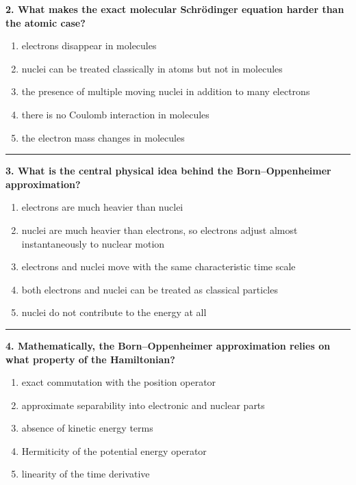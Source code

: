 \documentclass[
  english,
  9pt,
]{extbook}
\providecommand{\tightlist}{%
  \setlength{\itemsep}{0pt}\setlength{\parskip}{0pt}}
\theoremstyle{definition}
\theoremstyle{definition}
\theoremstyle{definition}
\theoremstyle{definition}
\theoremstyle{remark}
\begin{document}
\textbf{2. What makes the exact molecular Schrödinger equation harder than the atomic case?}

\begin{enumerate}
\def\labelenumi{\alph{enumi}.}
\tightlist
\item
  electrons disappear in molecules
\item
  nuclei can be treated classically in atoms but not in molecules
\item
  the presence of multiple moving nuclei in addition to many electrons
\item
  there is no Coulomb interaction in molecules
\item
  the electron mass changes in molecules
\end{enumerate}

\begin{center}\rule{0.5\linewidth}{0.5pt}\end{center}

\textbf{3. What is the central physical idea behind the Born--Oppenheimer approximation?}

\begin{enumerate}
\def\labelenumi{\alph{enumi}.}
\tightlist
\item
  electrons are much heavier than nuclei
\item
  nuclei are much heavier than electrons, so electrons adjust almost instantaneously to nuclear motion
\item
  electrons and nuclei move with the same characteristic time scale
\item
  both electrons and nuclei can be treated as classical particles
\item
  nuclei do not contribute to the energy at all
\end{enumerate}

\begin{center}\rule{0.5\linewidth}{0.5pt}\end{center}

\textbf{4. Mathematically, the Born--Oppenheimer approximation relies on what property of the Hamiltonian?}

\begin{enumerate}
\def\labelenumi{\alph{enumi}.}
\tightlist
\item
  exact commutation with the position operator
\item
  approximate separability into electronic and nuclear parts
\item
  absence of kinetic energy terms
\item
  Hermiticity of the potential energy operator
\item
  linearity of the time derivative
\end{enumerate}
\end{document}

